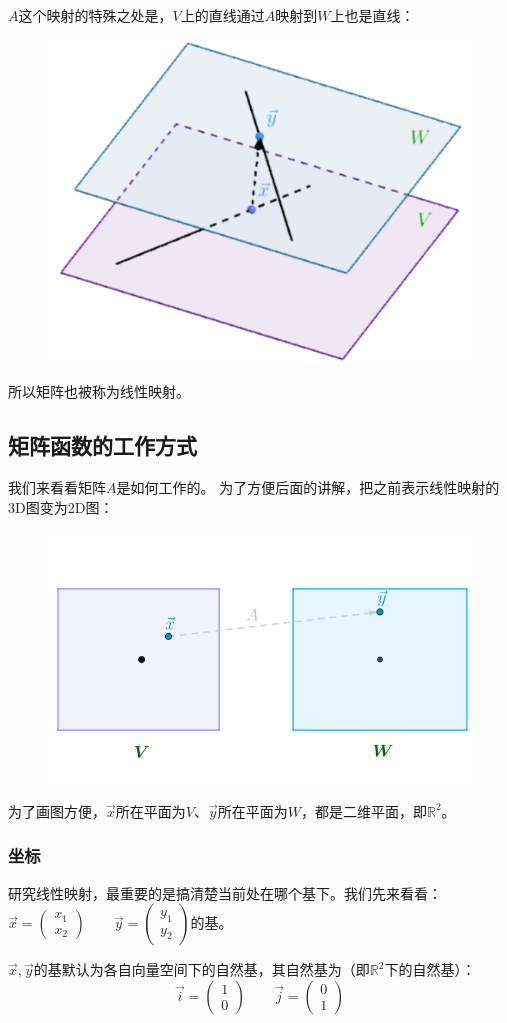 \documentclass[12pt]{article}
\begin{document}
$A$这个映射的特殊之处是，$V$上的直线通过$A$映射到$W$上也是直线：
\begin{figure}[H]
\centering
\includegraphics[width=.5\textwidth]{fig/UnderstandMatrixMultiplication_2.png}
\end{figure}

所以矩阵也被称为线性映射。

\subsection{矩阵函数的工作方式}
我们来看看矩阵$A$是如何工作的。
为了方便后面的讲解，把之前表示线性映射的3D图变为2D图：
\begin{figure}[H]
\centering
\includegraphics[width=.5\textwidth]{fig/UnderstandMatrixMultiplication_3.png}
\end{figure}

为了画图方便，$\vec{x}$所在平面为$V$、$\vec{y}$所在平面为$W$，都是二维平面，即$\mathbb{R}^2$。

\subsubsection{坐标}
研究线性映射，最重要的是搞清楚当前处在哪个基下。我们先来看看：
$\vec{x}=\begin{pmatrix}x_1\\x_2\end{pmatrix}\qquad\vec{y}=\begin{pmatrix}y_1\\y_2\end{pmatrix}$的基。

$\vec{x},\vec{y}$的基默认为各自向量空间下的自然基，其自然基为（即$\mathbb{R}^2$下的自然基）：
$$\vec{i}=\begin{pmatrix}1\\0\end{pmatrix}\qquad\vec{j}=\begin{pmatrix}0\\1\end{pmatrix}$$
\end{document}
